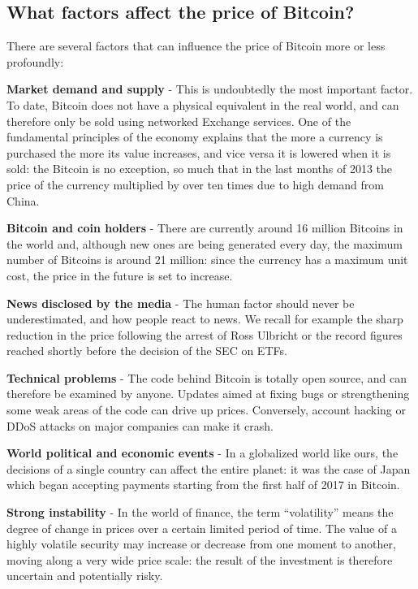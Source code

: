 \documentclass[11pt]{article}
\begin{document}
    \hypertarget{what-factors-affect-the-price-of-bitcoin}{%
\subsection{What factors affect the price of
Bitcoin?}\label{what-factors-affect-the-price-of-bitcoin}}

    There are several factors that can influence the price of Bitcoin more
or less profoundly:

    \textbf{Market demand and supply} - This is undoubtedly the most
important factor. To date, Bitcoin does not have a physical equivalent
in the real world, and can therefore only be sold using networked
Exchange services. One of the fundamental principles of the economy
explains that the more a currency is purchased the more its value
increases, and vice versa it is lowered when it is sold: the Bitcoin is
no exception, so much that in the last months of 2013 the price of the
currency multiplied by over ten times due to high demand from China.

    \textbf{Bitcoin and coin holders} - There are currently around 16
million Bitcoins in the world and, although new ones are being generated
every day, the maximum number of Bitcoins is around 21 million: since
the currency has a maximum unit cost, the price in the future is set to
increase.

    \textbf{News disclosed by the media} - The human factor should never be
underestimated, and how people react to news. We recall for example the
sharp reduction in the price following the arrest of Ross Ulbricht or
the record figures reached shortly before the decision of the SEC on
ETFs.

    \textbf{Technical problems} - The code behind Bitcoin is totally open
source, and can therefore be examined by anyone. Updates aimed at fixing
bugs or strengthening some weak areas of the code can drive up prices.
Conversely, account hacking or DDoS attacks on major companies can make
it crash.

    \textbf{World political and economic events} - In a globalized world
like ours, the decisions of a single country can affect the entire
planet: it was the case of Japan which began accepting payments starting
from the first half of 2017 in Bitcoin.

    \textbf{Strong instability} - In the world of finance, the term
``volatility'' means the degree of change in prices over a certain
limited period of time. The value of a highly volatile security may
increase or decrease from one moment to another, moving along a very
wide price scale: the result of the investment is therefore uncertain
and potentially risky.


    
    
    
    
\end{document}
